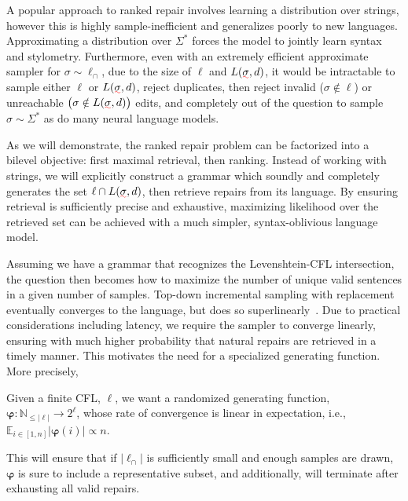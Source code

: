 \documentclass[sigplan,review,acmsmall,nonacm,screen,anonymous]{acmart}\settopmatter{printfolios=false,printccs=false,printacmref=false}
\begin{document}
A popular approach to ranked repair involves learning a distribution over strings, however this is highly sample-inefficient and generalizes poorly to new languages. Approximating a distribution over $\Sigma^*$ forces the model to jointly learn syntax and stylometry. Furthermore, even with an extremely efficient approximate sampler for $\sigma \sim \ell_\cap$, due to the size of $\ell$ and $L(\err\sigma, d)$, it would be intractable to sample either $\ell$ or $L(\err\sigma, d)$, reject duplicates, then reject invalid ($\sigma \notin \ell$) or unreachable $\big(\sigma \notin L(\err\sigma, d)\big)$ edits, and completely out of the question to sample $\sigma \sim \Sigma^*$ as do many neural language models.

As we will demonstrate, the ranked repair problem can be factorized into a bilevel objective: first maximal retrieval, then ranking. Instead of working with strings, we will explicitly construct a grammar which soundly and completely generates the set $\ell \cap L(\err\sigma, d)$, then retrieve repairs from its language. By ensuring retrieval is sufficiently precise and exhaustive, maximizing likelihood over the retrieved set can be achieved with a much simpler, syntax-oblivious language model.

Assuming we have a grammar that recognizes the Levenshtein-CFL intersection, the question then becomes how to maximize the number of unique valid sentences in a given number of samples. Top-down incremental sampling with replacement eventually converges to the language, but does so superlinearly~\cite{flajolet1992birthday}. Due to practical considerations including latency, we require the sampler to converge linearly, ensuring with much higher probability that natural repairs are retrieved in a timely manner. This motivates the need for a specialized generating function. More precisely,

\begin{definition}\label{def:linear-convergence}
Given a finite CFL, $\ell$, we want a randomized generating function, $\bm{\varphi}: \mathbb{N}_{\leq|\ell|} \rightarrow 2^\ell$, whose rate of convergence is linear in expectation, i.e., $\mathbb{E}_{i \in [1, n]}|\bm{\varphi}(i)| \propto n$.
\end{definition}

\noindent This will ensure that if $|\ell_\cap|$ is sufficiently small and enough samples are drawn, $\bm\varphi$ is sure to include a representative subset, and additionally, will terminate after exhausting all valid repairs.
\end{document}
